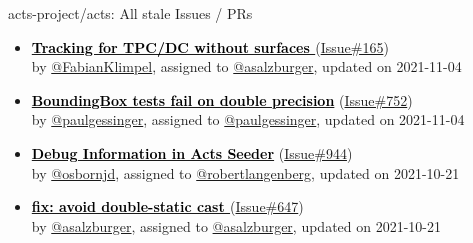 \begin{frame}[allowframebreaks]{ acts-project/acts: All stale Issues / PRs}
\begin{itemize}
    \item\iss\prstale
    \hspace*{0.1em}
    \textbf{\href{https://github.com/acts-project/acts/issues/165}{\textcolor{black}{Tracking for TPC/DC without surfaces }}}
    (\href{https://github.com/acts-project/acts/issues/165}{Issue\#165}) \\
    by \href{https://github.com/FabianKlimpel}{@FabianKlimpel}, {}assigned to \href{https://github.com/asalzburger}{@asalzburger}, updated on 2021-11-04

    \item\iss\prstale
    \hspace*{0.1em}
    \textbf{\href{https://github.com/acts-project/acts/issues/752}{\textcolor{black}{BoundingBox tests fail on double precision}}}
    (\href{https://github.com/acts-project/acts/issues/752}{Issue\#752}) \\
    by \href{https://github.com/paulgessinger}{@paulgessinger}, {}assigned to \href{https://github.com/paulgessinger}{@paulgessinger}, updated on 2021-11-04

    \item\iss\prstale
    \hspace*{0.1em}
    \textbf{\href{https://github.com/acts-project/acts/issues/944}{\textcolor{black}{Debug Information in Acts Seeder}}}
    (\href{https://github.com/acts-project/acts/issues/944}{Issue\#944}) \\
    by \href{https://github.com/osbornjd}{@osbornjd}, {}assigned to \href{https://github.com/robertlangenberg}{@robertlangenberg}, updated on 2021-10-21

    \item\iss\prstale
    \hspace*{0.1em}
    \textbf{\href{https://github.com/acts-project/acts/issues/647}{\textcolor{black}{fix: avoid double-static cast }}}
    (\href{https://github.com/acts-project/acts/issues/647}{Issue\#647}) \\
    by \href{https://github.com/asalzburger}{@asalzburger}, {}assigned to \href{https://github.com/asalzburger}{@asalzburger}, updated on 2021-10-21

  \end{itemize}
\end{frame}
